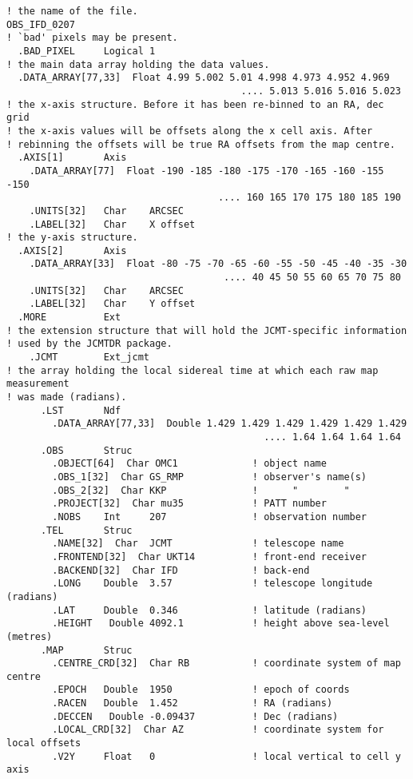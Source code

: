 \begin{small}
\begin{verbatim}
! the name of the file.
OBS_IFD_0207
! `bad' pixels may be present.
  .BAD_PIXEL     Logical 1
! the main data array holding the data values.
  .DATA_ARRAY[77,33]  Float 4.99 5.002 5.01 4.998 4.973 4.952 4.969
                                         .... 5.013 5.016 5.016 5.023
! the x-axis structure. Before it has been re-binned to an RA, dec grid
! the x-axis values will be offsets along the x cell axis. After
! rebinning the offsets will be true RA offsets from the map centre.
  .AXIS[1]       Axis
    .DATA_ARRAY[77]  Float -190 -185 -180 -175 -170 -165 -160 -155 -150
                                     .... 160 165 170 175 180 185 190
    .UNITS[32]   Char    ARCSEC
    .LABEL[32]   Char    X offset
! the y-axis structure.
  .AXIS[2]       Axis
    .DATA_ARRAY[33]  Float -80 -75 -70 -65 -60 -55 -50 -45 -40 -35 -30
                                      .... 40 45 50 55 60 65 70 75 80
    .UNITS[32]   Char    ARCSEC
    .LABEL[32]   Char    Y offset
  .MORE          Ext
! the extension structure that will hold the JCMT-specific information
! used by the JCMTDR package.
    .JCMT        Ext_jcmt
! the array holding the local sidereal time at which each raw map measurement
! was made (radians).
      .LST       Ndf
        .DATA_ARRAY[77,33]  Double 1.429 1.429 1.429 1.429 1.429 1.429
                                             .... 1.64 1.64 1.64 1.64
      .OBS       Struc
        .OBJECT[64]  Char OMC1             ! object name
        .OBS_1[32]  Char GS_RMP            ! observer's name(s)
        .OBS_2[32]  Char KKP               !      "        "
        .PROJECT[32]  Char mu35            ! PATT number
        .NOBS    Int     207               ! observation number
      .TEL       Struc
        .NAME[32]  Char  JCMT              ! telescope name
        .FRONTEND[32]  Char UKT14          ! front-end receiver
        .BACKEND[32]  Char IFD             ! back-end
        .LONG    Double  3.57              ! telescope longitude (radians)
        .LAT     Double  0.346             ! latitude (radians)
        .HEIGHT   Double 4092.1            ! height above sea-level (metres)
      .MAP       Struc
        .CENTRE_CRD[32]  Char RB           ! coordinate system of map centre
        .EPOCH   Double  1950              ! epoch of coords
        .RACEN   Double  1.452             ! RA (radians)
        .DECCEN   Double -0.09437          ! Dec (radians)
        .LOCAL_CRD[32]  Char AZ            ! coordinate system for local offsets
        .V2Y     Float   0                 ! local vertical to cell y axis

\end{verbatim}
\end{small}
